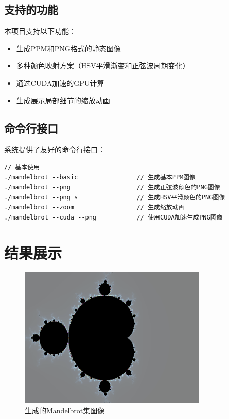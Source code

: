 \documentclass{article}
\begin{document}
\subsection{支持的功能}

本项目支持以下功能：

\begin{itemize}
    \item 生成PPM和PNG格式的静态图像
    \item 多种颜色映射方案（HSV平滑渐变和正弦波周期变化）
    \item 通过CUDA加速的GPU计算
    \item 生成展示局部细节的缩放动画
\end{itemize}

\subsection{命令行接口}

系统提供了友好的命令行接口：

\begin{lstlisting}
// 基本使用
./mandelbrot --basic                // 生成基本PPM图像
./mandelbrot --png                  // 生成正弦波颜色的PNG图像
./mandelbrot --png s                // 生成HSV平滑颜色的PNG图像
./mandelbrot --zoom                 // 生成缩放动画
./mandelbrot --cuda --png           // 使用CUDA加速生成PNG图像
\end{lstlisting}

\section{结果展示}

\begin{figure}[htbp]
    \centering
    \includegraphics[width=0.8\textwidth]{./figures/mandelbrot.png}
    \caption{生成的Mandelbrot集图像}
    \label{fig:mandelbrot}
\end{figure}
\end{document}
